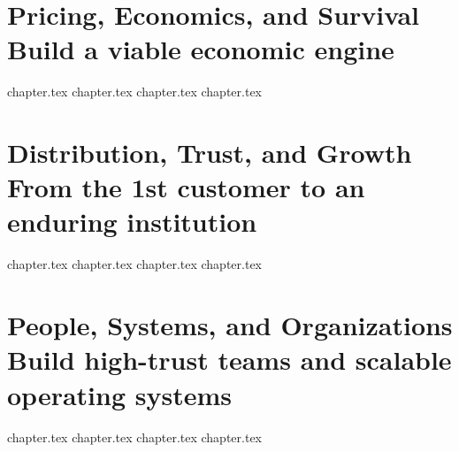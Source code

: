 \documentclass[10pt,twoside,openright]{book}
\begin{document}
  \part[Pricing, Economics, and Survival]{Pricing, Economics, and Survival\\[0.4ex]\fontsize{13}{17}\selectfont\mdseries\color{BayesSecondary}Build a viable economic engine}
  {chapter.tex}
  {chapter.tex}
  {chapter.tex}
  {chapter.tex}

  \part[Distribution, Trust, and Growth]{Distribution, Trust, and Growth\\[0.4ex]\fontsize{13}{17}\selectfont\mdseries\color{BayesSecondary}From the 1st customer to an enduring institution}
  {chapter.tex}
  {chapter.tex}
  {chapter.tex}
  {chapter.tex}

  \part[People, Systems, and Organizations]{People, Systems, and Organizations\\[0.4ex]\fontsize{13}{17}\selectfont\mdseries\color{BayesSecondary}Build high-trust teams and scalable operating systems}
  {chapter.tex}
  {chapter.tex}
  {chapter.tex}
  {chapter.tex}
\end{document}

